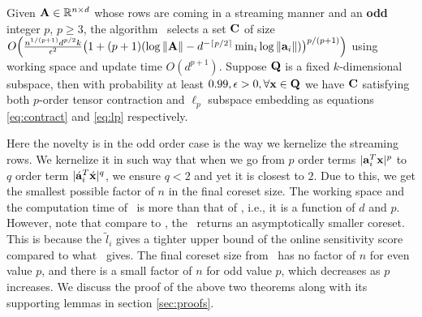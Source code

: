 % 
\begin{theorem}{\label{thm:slowOnlineOdd}}
 Given $\mathbf{A} \in \mathbb{R}^{n \times d}$ whose rows are coming in a streaming manner and an \textbf{odd} integer $p$, $p\ge3$, the algorithm ~selects a set $\mathbf{C}$ of size $O\Big(\frac{n^{1/(p+1)}d^{p/2}k}{\epsilon^{2}}\big(1+(p+1)(\log \|\mathbf{A}\|-d^{-\lceil p/2 \rceil}\min_{i}\log \|\mathbf{a}_{i}\|)\big)^{p/(p+1)}\Big)$ using working space and update time $O(d^{p+1})$. Suppose $\mathbf{Q}$ is a fixed $k$-dimensional subspace, then with probability at least $0.99, \epsilon > 0, \forall \mathbf{x} \in \mathbf{Q}$ we have $\mathbf{C}$ satisfying both $p$-order tensor contraction and $\ell_{p}$ subspace embedding as equations \eqref{eq:contract} and \eqref{eq:lp} respectively.
\end{theorem}
% 
Here the novelty is in the odd order case is the way we kernelize the streaming rows. We kernelize it in such way that when we go from $p$ order terms $|\mathbf{a}_{i}^{T}\mathbf{x}|^{p}$ to $q$ order term $|\acute{\mathbf{a}}_{i}^{T}\acute{\mathbf{x}}|^{q}$, we ensure $q<2$ and yet it is closest to $2$. Due to this, we get the smallest possible factor of $n$ in the final coreset size.
The working space and the computation time of ~is more than that of \online, i.e., it is a function of $d$ and $p$. However, note that compare to \online, the ~returns an asymptotically smaller coreset. This is because the $\tilde{l}_{i}$ gives a tighter upper bound of the online sensitivity score compared to what \online~gives. The final coreset size from ~has no factor of $n$ for even value $p$, and there is a small factor of $n$ for odd value $p$, which decreases as $p$ increases.
We discuss the proof of the above two theorems along with its supporting lemmas in section \ref{sec:proofs}.
% 
